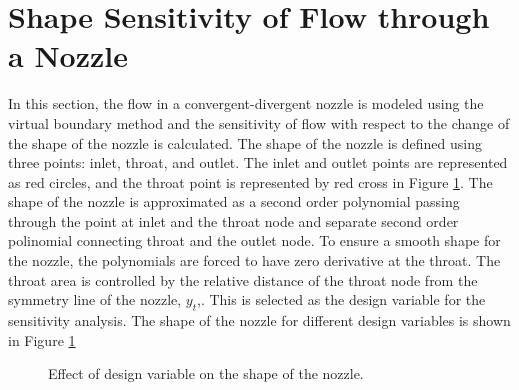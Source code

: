 \section{Shape Sensitivity of Flow through a Nozzle}
In this section, the flow in a convergent-divergent nozzle is modeled using the virtual boundary method and the sensitivity of flow with respect to the change of the shape of the nozzle is calculated.  The shape of the nozzle is defined using three points: inlet, throat, and outlet. The inlet and outlet points are represented as red circles, and the throat point is represented by red cross in Figure \ref{fig:C4_nozzleShape}. The shape of the nozzle is approximated as a second order polynomial passing through the point at inlet and the throat node and separate second order polinomial connecting throat and the outlet node. To ensure a smooth shape for the nozzle, the polynomials are forced to have zero derivative at the throat. The throat area is controlled by the relative distance of the throat node from the symmetry line of the nozzle, $y_t$,. This is selected as the design variable for the sensitivity analysis. The shape of the nozzle for different design variables is shown in Figure \ref{fig:C4_nozzleShape}

\begin{figure}[H]
    \centering
    \quad
    \caption{Effect of design variable on the shape of the nozzle.}
    \label{fig:C4_nozzleShape}
\end{figure}

